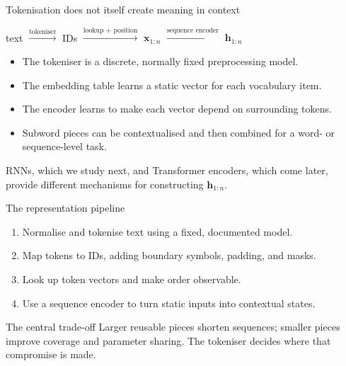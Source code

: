 \begin{frame}{Tokenisation does not itself create meaning in context}
  \begin{center}
    text
    $\xrightarrow{\text{tokeniser}}$
    IDs
    $\xrightarrow{\text{lookup + position}}$
    $\mathbf{x}_{1:n}$
    $\xrightarrow{\text{sequence encoder}}$
    $\mathbf{h}_{1:n}$
  \end{center}

  \begin{itemize}
    \item The tokeniser is a discrete, normally fixed preprocessing model.
    \item The embedding table learns a static vector for each vocabulary item.
    \item The encoder learns to make each vector depend on surrounding tokens.
    \item Subword pieces can be contextualised and then combined for a word- or
      sequence-level task.
  \end{itemize}

  RNNs, which we study next, and Transformer encoders, which come later, provide
  different mechanisms for constructing $\mathbf{h}_{1:n}$.
\end{frame}

\begin{frame}{The representation pipeline}
  \begin{enumerate}
    \item Normalise and tokenise text using a fixed, documented model.
    \item Map tokens to IDs, adding boundary symbols, padding, and masks.
    \item Look up token vectors and make order observable.
    \item Use a sequence encoder to turn static inputs into contextual states.
  \end{enumerate}

  \vspace{0.8em}
  \begin{block}{The central trade-off}
    Larger reusable pieces shorten sequences; smaller pieces improve coverage and
    parameter sharing. The tokeniser decides where that compromise is made.
  \end{block}
\end{frame}


